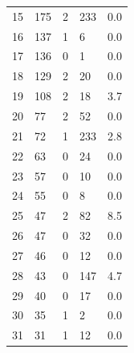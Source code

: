 \begin{table}[H]
\begin{tabular}{lllll}
15              & 175               & 2                        & 233                    & 0.0                        \\
16              & 137               & 1                        & 6                      & 0.0                        \\
17              & 136               & 0                        & 1                      & 0.0                        \\
18              & 129               & 2                        & 20                     & 0.0                        \\
19              & 108               & 2                        & 18                     & 3.7                        \\
20              & 77                & 2                        & 52                     & 0.0                        \\
21              & 72                & 1                        & 233                    & 2.8                        \\
22              & 63                & 0                        & 24                     & 0.0                        \\
23              & 57                & 0                        & 10                     & 0.0                        \\
24              & 55                & 0                        & 8                      & 0.0                        \\
25              & 47                & 2                        & 82                     & 8.5                        \\
26              & 47                & 0                        & 32                     & 0.0                        \\
27              & 46                & 0                        & 12                     & 0.0                        \\
28              & 43                & 0                        & 147                    & 4.7                        \\
29              & 40                & 0                        & 17                     & 0.0                        \\
30              & 35                & 1                        & 2                      & 0.0                        \\
31              & 31                & 1                        & 12                     & 0.0                        \\

\end{tabular}
\end{table}
